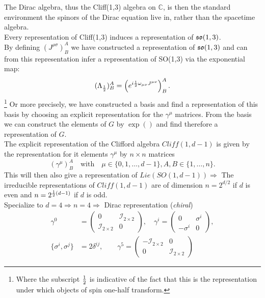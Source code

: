 The Dirac algebra, thus the Cliff(1,3) algebra on $\mathbb{C}$, is then the standard environment the spinors of the Dirac equation live in, rather than the spacetime algebra.\\
Every representation of Cliff(1,3) induces a representation of $\mathfrak{so}(1,3)$.\\
By defining $(J^{\rho \sigma})^A_B$ we have constructed a representation of $\mathfrak{so}(1,3)$ and can from this representation infer a representation of SO(1,3) via the exponential map:
\begin{equation}
(\Lambda_{\frac{1}{2}})^A_B = \left(e^{i \frac{1}{2} \omega_{\mu \nu} J^{\mu \nu}} \right)^A_B.
\end{equation}\footnote{Where the subscript $\frac{1}{2}$ is indicative of the fact that this is the representation under which objects of spin one-half transform.}
Or more precisely, we have constructed a basis and find a representation of this basis by choosing an explicit representation for the $\gamma^{\mu}$ matrices. From the basis we can construct the elements of $G$ by $\exp()$ and find therefore a representation of $G$.\\
The explicit representation of the Clifford algebra $Cliff(1,d-1)$ is given by the representation for it elements $\gamma^{\mu}$ by $n\times n$ matrices 
\begin{equation}
(\gamma^{\mu})^A_B \quad \mathrm{with} \quad \mu\in \{0,1, \dots, d-1\}, A,B\in\{1,\dots, n \}.
\end{equation}
This will then also give a representation of $Lie(SO(1,d-1)) \Rightarrow$ The irreducible representations of $Cliff(1,d-1)$ are of dimension    $n=2^{d/2}$ if $d$ is even and $n=2^{\frac{1}{2} (d-1)}$ if $d$ is odd.\\
Specialize to $d=4 \Rightarrow n=4 \Rightarrow$ Dirac representation (\emph{chiral})
\begin{align}
	\gamma^0 &= \begin{pmatrix}
		0 & \mathcal{I}_{2\times 2} \\
		\mathcal{I}_{2 \times 2} & 0 
	\end{pmatrix},
	\quad 
	\gamma^i=
	\begin{pmatrix}
		0 & \sigma^i \\-\sigma^i &0
	\end{pmatrix},
	\\
	\{\sigma^i, \sigma^j\} &=2 \delta^{ij}, \qquad \gamma^5=
	\begin{pmatrix}
		-\mathcal{I}_{2\times 2} &0 \\
		0& \mathcal{I}_{2 \times 2}
	\end{pmatrix}
\end{align}
